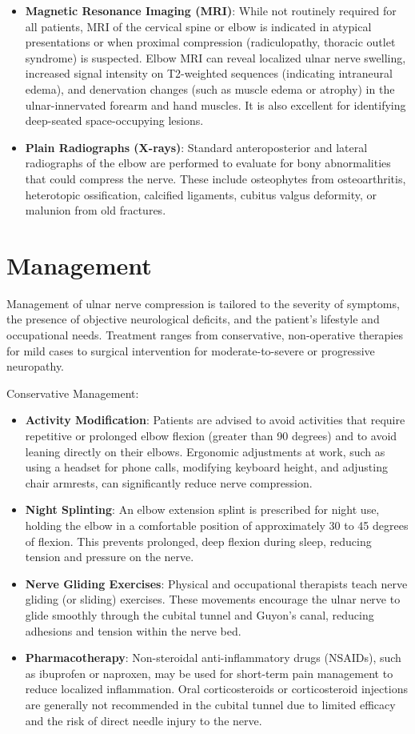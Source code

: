\begin{itemize}
  \item \textbf{Magnetic Resonance Imaging (MRI)}: While not routinely required for all patients, MRI of the cervical spine or elbow is indicated in atypical presentations or when proximal compression (radiculopathy, thoracic outlet syndrome) is suspected. Elbow MRI can reveal localized ulnar nerve swelling, increased signal intensity on T2-weighted sequences (indicating intraneural edema), and denervation changes (such as muscle edema or atrophy) in the ulnar-innervated forearm and hand muscles. It is also excellent for identifying deep-seated space-occupying lesions.
  \item \textbf{Plain Radiographs (X-rays)}: Standard anteroposterior and lateral radiographs of the elbow are performed to evaluate for bony abnormalities that could compress the nerve. These include osteophytes from osteoarthritis, heterotopic ossification, calcified ligaments, cubitus valgus deformity, or malunion from old fractures.
\end{itemize}

\section*{Management}
Management of ulnar nerve compression is tailored to the severity of symptoms, the presence of objective neurological deficits, and the patient's lifestyle and occupational needs. Treatment ranges from conservative, non-operative therapies for mild cases to surgical intervention for moderate-to-severe or progressive neuropathy.

Conservative Management:
\begin{itemize}
  \item \textbf{Activity Modification}: Patients are advised to avoid activities that require repetitive or prolonged elbow flexion (greater than 90 degrees) and to avoid leaning directly on their elbows. Ergonomic adjustments at work, such as using a headset for phone calls, modifying keyboard height, and adjusting chair armrests, can significantly reduce nerve compression.
  \item \textbf{Night Splinting}: An elbow extension splint is prescribed for night use, holding the elbow in a comfortable position of approximately 30 to 45 degrees of flexion. This prevents prolonged, deep flexion during sleep, reducing tension and pressure on the nerve.
  \item \textbf{Nerve Gliding Exercises}: Physical and occupational therapists teach nerve gliding (or sliding) exercises. These movements encourage the ulnar nerve to glide smoothly through the cubital tunnel and Guyon's canal, reducing adhesions and tension within the nerve bed.
  \item \textbf{Pharmacotherapy}: Non-steroidal anti-inflammatory drugs (NSAIDs), such as ibuprofen or naproxen, may be used for short-term pain management to reduce localized inflammation. Oral corticosteroids or corticosteroid injections are generally not recommended in the cubital tunnel due to limited efficacy and the risk of direct needle injury to the nerve.
\end{itemize}

